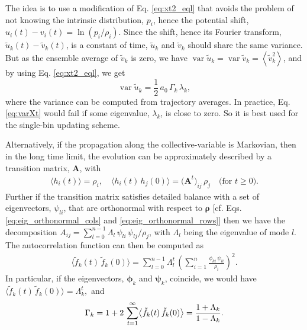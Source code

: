 \documentclass[preprint, superscriptaddress, floatfix]{revtex4-1}
\begin{document}
The idea is to use a modification
of Eq. \eqref{eq:xt2_eql}
that avoids the problem of not
knowing the intrinsic distribution, $p_i$,
hence the potential shift,
$u_i(t) - v_i(t) = \ln(p_i/\rho_i)$.
%
Since the shift,
hence its Fourier transform,
$\tilde u_k(t) - \tilde v_k(t)$,
is a constant of time,
${\tilde u}_{k}$ and ${\tilde v}_{k}$
should share the same variance.
%
But as the ensemble average of ${\tilde v}_{k}$
is zero, we have
$\operatorname{var} {\tilde u}_{k} =
 \operatorname{var} {\tilde v}_{k} =
 \left\langle {\tilde v}_{k}^2 \right\rangle$,
%
and by using Eq. \eqref{eq:xt2_eql},
we get
%
\begin{equation}
  \operatorname{var} {\tilde u}_k
  =
  \frac{1}{2} \,
  a_0 \, \Gamma_k \, \lambda_k,
\label{eq:varXt}
\end{equation}
%
where the variance can be computed from trajectory averages.
%
In practice, Eq. \eqref{eq:varXt}
would fail if some eigenvalue, $\lambda_k$, is close to zero.
So it is best used for the single-bin updating scheme.

Alternatively,
if the propagation along the collective-variable is Markovian,
then in the long time limit, the evolution can be approximately
described by a transition matrix, $\mathbf A$, with
\begin{align*}
\langle h_i(t) \rangle = \rho_i,
\quad
\langle h_i(t) \, h_j(0) \rangle = \bigl(\mathbf A^t\bigr)_{ij} \, \rho_j
\quad \mbox{(for $t \ge 0$)}
.
\end{align*}
Further if the transition matrix satisfies detailed balance
with a set of eigenvectors, $\psi_{li}$,
that are orthonormal with respect to $\pmb\rho$
[cf. Eqs. \eqref{eq:eig_orthonormal_cols} and
\eqref{eq:eig_orthonormal_rows}]
then we have the decomposition
$A_{ij} = \sum_{l=0}^{n-1} \Lambda_l \, \psi_{li} \, \psi_{lj} / \rho_j$,
with $\Lambda_l$ being the eigenvalue of mode $l$.
%
The autocorrelation function can then be computed as
%
\begin{align*}
\bigl\langle
  \tilde f_k(t) \, \tilde f_k(0)
\bigr\rangle
=
\sum_{l = 0}^{n-1} \Lambda_l^t \,
\left(
  \sum_{i=1}^n \frac{ \phi_{ki} \, \psi_{li} }{ \rho_i }
\right)^2
.
\end{align*}
%
In particular, if the eigenvectors, $\pmb \phi_k$
and $\pmb \psi_k$, coincide,
we would have
$\bigl\langle
  \tilde f_k(t) \, \tilde f_k(0)
\bigr\rangle
=
\Lambda_k^t,$
and
\begin{equation}
  \Gamma_k = 1 + 2 \, \sum_{t=1}^\infty
  \bigl\langle
    \tilde f_k(t) \, \tilde f_k(0)
  \bigr\rangle
  = \frac{1+\Lambda_k}{1-\Lambda_k}
  .
  \notag
\end{equation}
\end{document}
